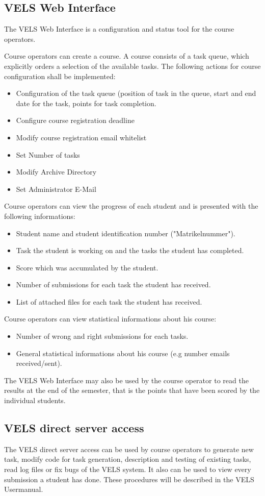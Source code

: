 \subsection{VELS Web Interface}\label{webinterface}

The VELS Web Interface is a configuration and status tool for the course operators.

Course operators can create a course. A course consists of a task queue, which explicitly orders a 
selection of the available tasks. The following actions for course configuration shall be implemented:
\begin{itemize}
\item Configuration of the task queue (position of task in the queue, start and end date for the task,
    points for task completion.
\item Configure course registration deadline
\item Modify course registration email whitelist 
\item Set Number of tasks 
\item Modify Archive Directory
\item Set Administrator E-Mail
\end{itemize}

Course operators can view the progress of each student and is presented with the following informations:
\begin{itemize}
\item Student name and student identification number ("Matrikelnummer").
\item Task the student is working on and the tasks the student has completed.
\item Score which was accumulated by the student.
\item Number of submissions for each task the student has received.
\item List of attached files for each task the student has received.
\end{itemize}

Course operators can view statistical informations about his course:
\begin{itemize}
\item Number of wrong and right submissions for each tasks.
\item General statistical informations about his course (e.g number emails received/sent).
\end{itemize}

The VELS Web Interface may also be used by the course operator to read the results at the end of the semester,
that is the points that have been scored by the individual students.


\subsection{VELS direct server access}\label{directserveraccess}
The VELS direct server access can be used by course operators to generate new task, modify code for task
generation, description and testing of existing tasks, read log files or fix bugs of the VELS system. 
It also can be used to view every submission a student has done. These procedures will be described in 
the VELS Usermanual.